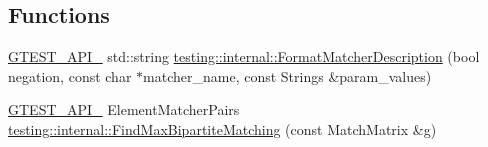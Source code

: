 \subsection*{Functions}
\begin{DoxyCompactItemize}
\item 
\mbox{\hyperlink{_obj__test_2lib_2googletest-release-1_88_81_2googletest_2include_2gtest_2internal_2gtest-port_8h_aa73be6f0ba4a7456180a94904ce17790}{G\+T\+E\+S\+T\+\_\+\+A\+P\+I\+\_\+}} std\+::string \mbox{\hyperlink{namespacetesting_1_1internal_ace0ed89106e622e9b5da449ae269616d}{testing\+::internal\+::\+Format\+Matcher\+Description}} (bool negation, const char $\ast$matcher\+\_\+name, const Strings \&param\+\_\+values)
\item 
\mbox{\hyperlink{_obj__test_2lib_2googletest-release-1_88_81_2googletest_2include_2gtest_2internal_2gtest-port_8h_aa73be6f0ba4a7456180a94904ce17790}{G\+T\+E\+S\+T\+\_\+\+A\+P\+I\+\_\+}} Element\+Matcher\+Pairs \mbox{\hyperlink{namespacetesting_1_1internal_ae30bd8357c179334b2b09b0d689efccc}{testing\+::internal\+::\+Find\+Max\+Bipartite\+Matching}} (const Match\+Matrix \&g)
\end{DoxyCompactItemize}
